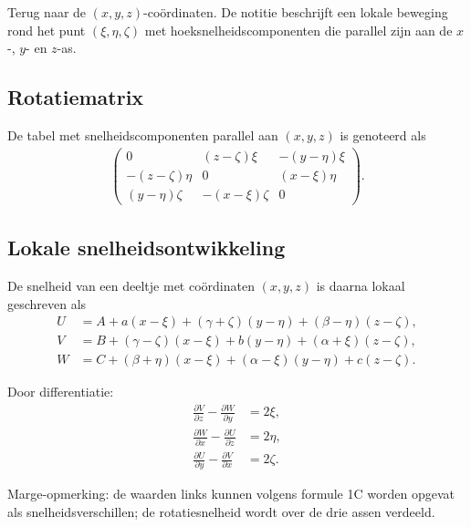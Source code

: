 \documentclass[11pt]{article}
\newcommand{\pd}[2]{\frac{\partial #1}{\partial #2}}
\newcommand{\onzeker}[1]{\textcolor{red!70!black}{#1}}
\begin{document}
Terug naar de $\left(x,y,z\right)$-coördinaten. De notitie beschrijft een lokale beweging rond het punt
$\left(\xi,\eta,\zeta\right)$ met hoeksnelheidscomponenten die parallel zijn aan de $x$-, $y$- en $z$-as.

\subsection*{Rotatiematrix}

De tabel met snelheidscomponenten parallel aan $\left(x,y,z\right)$ is genoteerd als
\begin{align*}
\begin{pmatrix}
0
&
\left(z-\zeta\right)\xi
&
-\left(y-\eta\right)\xi
\\[0.5em]
-\left(z-\zeta\right)\eta
&
0
&
\left(x-\xi\right)\eta
\\[0.5em]
\left(y-\eta\right)\zeta
&
-\left(x-\xi\right)\zeta
&
0
\end{pmatrix}.
\end{align*}

\subsection*{Lokale snelheidsontwikkeling}

De snelheid van een deeltje met coördinaten $\left(x,y,z\right)$ is daarna lokaal geschreven als
\begin{align*}
U
&=
A+a\left(x-\xi\right)
+\left(\gamma+\zeta\right)\left(y-\eta\right)
+\left(\beta-\eta\right)\left(z-\zeta\right),
\\
V
&=
B+\left(\gamma-\zeta\right)\left(x-\xi\right)
+b\left(y-\eta\right)
+\left(\alpha+\xi\right)\left(z-\zeta\right),
\\
W
&=
C+\left(\beta+\eta\right)\left(x-\xi\right)
+\left(\alpha-\xi\right)\left(y-\eta\right)
+c\left(z-\zeta\right).
\end{align*}

Door differentiatie:
\begin{align*}
\pd{V}{z}-\pd{W}{y} &= 2\xi,\\
\pd{W}{x}-\pd{U}{z} &= 2\eta,\\
\pd{U}{y}-\pd{V}{x} &= 2\zeta.
\end{align*}

\noindent
Marge-opmerking: de waarden links kunnen volgens formule \onzeker{1C} worden opgevat als snelheidsverschillen; de rotatiesnelheid wordt over de drie assen verdeeld.

\newpage
\end{document}
